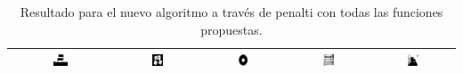 \begin{table}
\centering
\begin{tabular}{ccccc}\hline
\includegraphics[width=0.15\textwidth]{img/res/e2a/alg1agregate-chair.jpg} &
\includegraphics[width=0.15\textwidth]{img/res/e2a/alg1agregate-block.jpg} &
\includegraphics[width=0.15\textwidth]{img/res/e2a/alg1agregate-02.jpg} &
\includegraphics[width=0.15\textwidth]{img/res/e2a/alg1agregate-09.jpg} &
\includegraphics[width=0.15\textwidth]{img/res/e2a/alg1agregate-07.jpg}\\\hline
\end{tabular}
\caption{Resultado para el nuevo algoritmo a través de penalti con todas las funciones propuestas.\label{tab:resultexp2agregado}}
\end{table}




